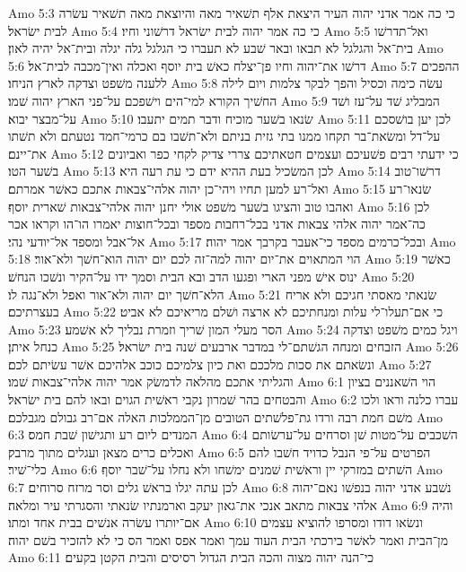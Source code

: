 Amo 5:3  כי כה אמר אדני יהוה העיר היצאת אלף תשׁאיר מאה והיוצאת מאה תשׁאיר עשׂרה לבית ישׂראל׃
Amo 5:4  כי כה אמר יהוה לבית ישׂראל דרשׁוני וחיו׃
Amo 5:5  ואל־תדרשׁו בית־אל והגלגל לא תבאו ובאר שׁבע לא תעברו כי הגלגל גלה יגלה ובית־אל יהיה לאון׃
Amo 5:6  דרשׁו את־יהוה וחיו פן־יצלח כאשׁ בית יוסף ואכלה ואין־מכבה לבית־אל׃
Amo 5:7  ההפכים ללענה משׁפט וצדקה לארץ הניחו׃
Amo 5:8  עשׂה כימה וכסיל והפך לבקר צלמות ויום לילה החשׁיך הקורא למי־הים וישׁפכם על־פני הארץ יהוה שׁמו׃
Amo 5:9  המבליג שׁד על־עז ושׁד על־מבצר יבוא׃
Amo 5:10  שׂנאו בשׁער מוכיח ודבר תמים יתעבו׃
Amo 5:11  לכן יען בושׁסכם על־דל ומשׂאת־בר תקחו ממנו בתי גזית בניתם ולא־תשׁבו בם כרמי־חמד נטעתם ולא תשׁתו את־יינם׃
Amo 5:12  כי ידעתי רבים פשׁעיכם ועצמים חטאתיכם צררי צדיק לקחי כפר ואביונים בשׁער הטו׃
Amo 5:13  לכן המשׂכיל בעת ההיא ידם כי עת רעה היא׃
Amo 5:14  דרשׁו־טוב ואל־רע למען תחיו ויהי־כן יהוה אלהי־צבאות אתכם כאשׁר אמרתם׃
Amo 5:15  שׂנאו־רע ואהבו טוב והציגו בשׁער משׁפט אולי יחנן יהוה אלהי־צבאות שׁארית יוסף׃
Amo 5:16  לכן כה־אמר יהוה אלהי צבאות אדני בכל־רחבות מספד ובכל־חוצות יאמרו הו־הו וקראו אכר אל־אבל ומספד אל־יודעי נהי׃
Amo 5:17  ובכל־כרמים מספד כי־אעבר בקרבך אמר יהוה׃
Amo 5:18  הוי המתאוים את־יום יהוה למה־זה לכם יום יהוה הוא־חשׁך ולא־אור׃
Amo 5:19  כאשׁר ינוס אישׁ מפני הארי ופגעו הדב ובא הבית וסמך ידו על־הקיר ונשׁכו הנחשׁ׃
Amo 5:20  הלא־חשׁך יום יהוה ולא־אור ואפל ולא־נגה לו׃
Amo 5:21  שׂנאתי מאסתי חגיכם ולא אריח בעצרתיכם׃
Amo 5:22  כי אם־תעלו־לי עלות ומנחתיכם לא ארצה ושׁלם מריאיכם לא אביט׃
Amo 5:23  הסר מעלי המון שׁריך וזמרת נבליך לא אשׁמע׃
Amo 5:24  ויגל כמים משׁפט וצדקה כנחל איתן׃
Amo 5:25  הזבחים ומנחה הגשׁתם־לי במדבר ארבעים שׁנה בית ישׂראל׃
Amo 5:26  ונשׂאתם את סכות מלככם ואת כיון צלמיכם כוכב אלהיכם אשׁר עשׂיתם לכם׃
Amo 5:27  והגליתי אתכם מהלאה לדמשׂק אמר יהוה אלהי־צבאות שׁמו׃
Amo 6:1  הוי השׁאננים בציון והבטחים בהר שׁמרון נקבי ראשׁית הגוים ובאו להם בית ישׂראל׃
Amo 6:2  עברו כלנה וראו ולכו משׁם חמת רבה ורדו גת־פלשׁתים הטובים מן־הממלכות האלה אם־רב גבולם מגבלכם׃
Amo 6:3  המנדים ליום רע ותגישׁון שׁבת חמס׃
Amo 6:4  השׁכבים על־מטות שׁן וסרחים על־ערשׂותם ואכלים כרים מצאן ועגלים מתוך מרבק׃
Amo 6:5  הפרטים על־פי הנבל כדויד חשׁבו להם כלי־שׁיר׃
Amo 6:6  השׁתים במזרקי יין וראשׁית שׁמנים ימשׁחו ולא נחלו על־שׁבר יוסף׃
Amo 6:7  לכן עתה יגלו בראשׁ גלים וסר מרזח סרוחים׃
Amo 6:8  נשׁבע אדני יהוה בנפשׁו נאם־יהוה אלהי צבאות מתאב אנכי את־גאון יעקב וארמנתיו שׂנאתי והסגרתי עיר ומלאה׃
Amo 6:9  והיה אם־יותרו עשׂרה אנשׁים בבית אחד ומתו׃
Amo 6:10  ונשׂאו דודו ומסרפו להוציא עצמים מן־הבית ואמר לאשׁר בירכתי הבית העוד עמך ואמר אפס ואמר הס כי לא להזכיר בשׁם יהוה׃
Amo 6:11  כי־הנה יהוה מצוה והכה הבית הגדול רסיסים והבית הקטן בקעים׃
